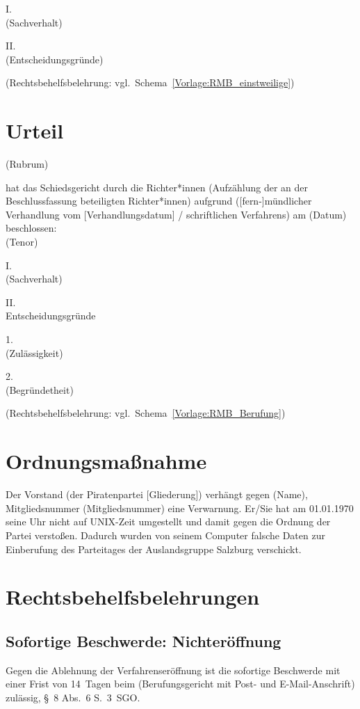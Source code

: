 I.\\
(Sachverhalt)

II.\\
(Entscheidungsgründe)

(Rechtsbehelfsbelehrung: vgl.~Schema~\ref{Vorlage:RMB_einstweilige})

\section{Urteil}
\label{Vorlage:Urteil}
(Rubrum)

hat das Schiedsgericht durch die Richter*innen (Aufzählung der an der Beschlussfassung beteiligten Richter*innen) aufgrund ([fern-]mündlicher Verhandlung vom [Verhandlungsdatum] / schriftlichen Verfahrens) am (Datum) beschlossen:\\
(Tenor)

I.\\
(Sachverhalt)

II.\\
Entscheidungsgründe

1.\\
(Zulässigkeit)

2.\\
(Begründetheit)

(Rechtsbehelfsbelehrung: vgl.~Schema~\ref{Vorlage:RMB_Berufung})

\section{Ordnungsmaßnahme}
\label{Vorlage:OM}
Der Vorstand (der Piratenpartei [Gliederung]) verhängt gegen (Name), Mitgliedsnummer (Mitgliedsnummer) eine Verwarnung.
Er/Sie hat am 01.01.1970 seine Uhr nicht auf UNIX-Zeit umgestellt und damit gegen die Ordnung der Partei verstoßen.
Dadurch wurden von seinem Computer falsche Daten zur Einberufung des Parteitages der Auslandsgruppe Salzburg verschickt.

\section{Rechtsbehelfsbelehrungen}
\subsection{Sofortige Beschwerde: Nichteröffnung}
\label{Vorlage:RMB_Eröffnungsbeschwerde}
Gegen die Ablehnung der Verfahrenseröffnung ist die sofortige Beschwerde mit einer Frist von 14~Tagen beim (Berufungsgericht mit Post- und E-Mail-Anschrift) zulässig, \S~8 Abs.~6 S.~3~SGO.

